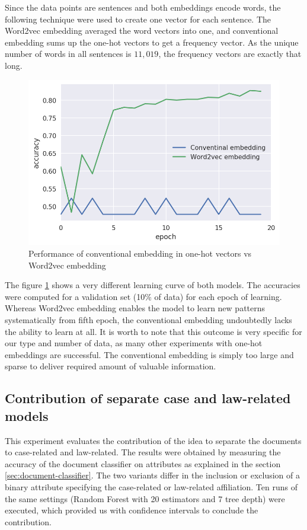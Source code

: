 \documentclass[
  digital, %
  notable,   %
  nolof,     %
  nolot,     %
]{fithesis3}
\begin{document}
Since the data points are sentences and both embeddings encode words, the following technique were used to create one vector for each sentence.
The Word2vec embedding averaged the word vectors into one, and conventional embedding sums up the one-hot vectors to get a frequency vector.
As the unique number of words in all sentences is $11,019$, the frequency vectors are exactly that long.

\begin{figure}[h]
\caption{Performance of conventional embedding in one-hot vectors vs Word2vec embedding}
\label{fig:eval_word2vec_contribution}
\includegraphics[width=\textwidth]{img/eval_word2vec_contribution}
\end{figure}

The figure \ref{fig:eval_word2vec_contribution} shows a very different learning curve of both models.
The accuracies were computed for a validation set (10\% of data) for each epoch of learning.
Whereas Word2vec embedding enables the model to learn new patterns systematically from fifth epoch, the conventional embedding undoubtedly lacks the ability to learn at all.
It is worth to note that this outcome is very specific for our type and number of data, as many other experiments with one-hot embeddings are successful.  
The conventional embedding is simply too large and sparse to deliver required amount of valuable information.


\subsection{Contribution of separate case and law-related models}
This experiment evaluates the contribution of the idea to separate the documents to case-related and law-related.
The results were obtained by measuring the accuracy of the document classifier on attributes as explained in the section \ref{sec:document-classifier}.
The two variants differ in the inclusion or exclusion of a binary attribute specifying the case-related or law-related affiliation.
Ten runs of the same settings (Random Forest with 20 estimators and 7 tree depth) were executed, which provided us with confidence intervals to conclude the contribution.
\end{document}
